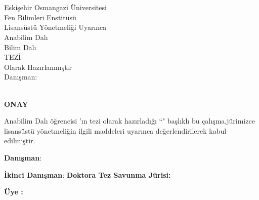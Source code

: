 \documentclass[]{esogu}			%
\begin{document}
\begin{titlingpage*}
\begin{center}
\vspace*{10mm}
\tbaslik\\								%
\vspace{12pc}							%
\yazar	\\								%
\vspace{8pc}							%
Eskişehir Osmangazi Üniversitesi\\		
Fen Bilimleri Enstitüsü\\
Lisansüstü Yönetmeliği Uyarınca\\
\bolum \space Anabilim Dalı\\
\bilim \space Bilim Dalı\\
\unvan \space TEZİ\\
Olarak Hazırlanmıştır\\
\vspace{7pc}
Danışman:\space \danisman\\			
\vfill	
\vspace{1pc}
\teslim\\
\vspace{2cm}
\end{center}

\end{titlingpage*}
\normalsize

\thispagestyle{empty}
\begin{center}
\large
\textbf{ONAY} 
\normalsize
\end{center}

\bolum \space Anabilim Dalı \unvan \space öğrencisi \yazar'ın \space \unvan\space tezi olarak hazırladığı ``\textbf{\tbaslik}" başlıklı bu çalışma,\space jürimizce lisansüstü yönetmeliğin ilgili maddeleri uyarınca değerlendirilerek kabul edilmiştir.
\vspace{15mm}

\noindent \textbf{Danışman}\space\space\space\space\space\space\space\space:\space \danisman 

\noindent \textbf{İkinci Danışman}\space:\space \ikidanisman
\newline
\noindent \textbf{Doktora Tez Savunma Jürisi:}

\noindent \textbf{Üye :\space}\jbir
\end{document}
